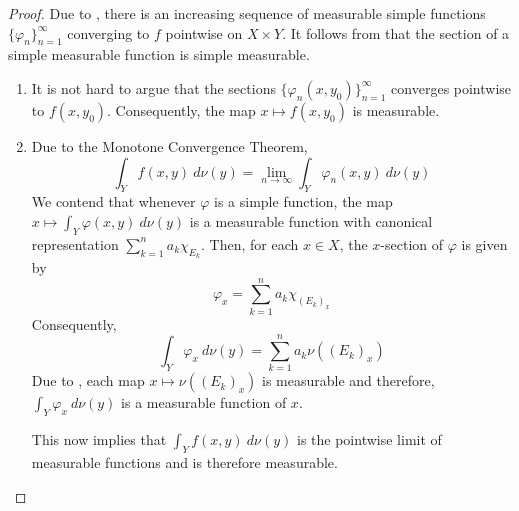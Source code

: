 \begin{proof}
Due to , there is an increasing sequence of measurable simple functions $\{\varphi_n\}_{n = 1}^\infty$ converging to $f$ pointwise on $X\times Y$. It follows from  that the section of a simple measurable function is simple measurable. 

\begin{enumerate}[label=(\alph*)]
\item It is not hard to argue that the sections $\{\varphi_n(x,y_0)\}_{n = 1}^\infty$ converges pointwise to $f(x,y_0)$. Consequently, the map $x\mapsto f(x,y_0)$ is measurable.

\item Due to the Monotone Convergence Theorem, 
\begin{equation*}
    \int_Y f(x,y)~d\nu(y) = \lim_{n\to\infty}\int_Y\varphi_n(x, y)~d\nu(y)
\end{equation*}
We contend that whenever $\varphi$ is a simple function, the map $x\mapsto\int_Y\varphi(x,y)~d\nu(y)$ is a measurable function with canonical representation $\sum_{k = 1}^n a_k\chi_{E_k}$. Then, for each $x\in X$, the $x$-section of $\varphi$ is given by 
\begin{equation*}
    \varphi_x = \sum_{k = 1}^n a_k\chi_{(E_k)_x}
\end{equation*}
Consequently, 
\begin{equation*}
    \int_Y\varphi_x~d\nu(y) = \sum_{k = 1}^n a_k\nu((E_k)_x)
\end{equation*}
Due to , each map $x\mapsto\nu((E_k)_x)$ is measurable and therefore, $\int_Y\varphi_x~d\nu(y)$ is a measurable function of $x$.

This now implies that $\int_Yf(x,y)~d\nu(y)$ is the pointwise limit of measurable functions and is therefore measurable.


\end{enumerate}
\end{proof}
